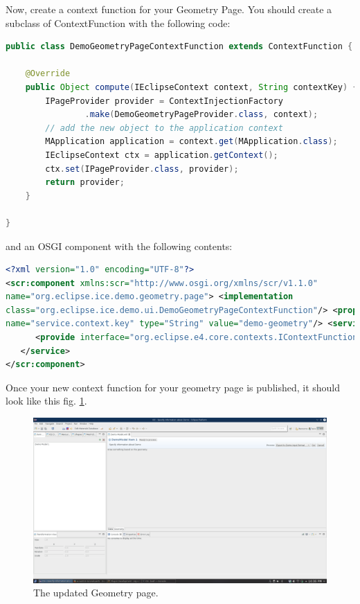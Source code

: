 \documentclass{article}
\begin{document}
Now, create a context function for your Geometry Page. You should create a
subclass of ContextFunction with the following code:

\begin{lstlisting}[language=java]
public class DemoGeometryPageContextFunction extends ContextFunction {

    @Override
    public Object compute(IEclipseContext context, String contextKey) {
        IPageProvider provider = ContextInjectionFactory
                .make(DemoGeometryPageProvider.class, context);
        // add the new object to the application context
        MApplication application = context.get(MApplication.class);
        IEclipseContext ctx = application.getContext();
        ctx.set(IPageProvider.class, provider);
        return provider;
    }

}
\end{lstlisting}

and an OSGI component with the following contents:

\begin{lstlisting}[language=xml]
<?xml version="1.0" encoding="UTF-8"?>
<scr:component xmlns:scr="http://www.osgi.org/xmlns/scr/v1.1.0"
name="org.eclipse.ice.demo.geometry.page"> <implementation
class="org.eclipse.ice.demo.ui.DemoGeometryPageContextFunction"/> <property
name="service.context.key" type="String" value="demo-geometry"/> <service>
      <provide interface="org.eclipse.e4.core.contexts.IContextFunction"/>
   </service>
</scr:component>
\end{lstlisting}

Once your new context function for your geometry page is published, it should
look like this fig. \ref{fig:iceDemoGeometryPage}.

\begin{figure}[h]
\includegraphics[width=\textwidth]{pics/dynamicUI_demoGeometryPage.png}
\caption{The updated Geometry page.}
\label{fig:iceDemoGeometryPage}
\end{figure}
\end{document}
